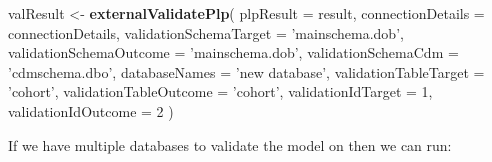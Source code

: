 \documentclass[11pt]{book}
\newenvironment{Shaded}{\begin{snugshade}}{\end{snugshade}}
\newcommand{\KeywordTok}[1]{\textcolor[rgb]{0.13,0.29,0.53}{\textbf{#1}}}
\newcommand{\DataTypeTok}[1]{\textcolor[rgb]{0.13,0.29,0.53}{#1}}
\newcommand{\DecValTok}[1]{\textcolor[rgb]{0.00,0.00,0.81}{#1}}
\newcommand{\StringTok}[1]{\textcolor[rgb]{0.31,0.60,0.02}{#1}}
\newcommand{\NormalTok}[1]{#1}
\theoremstyle{definition}
\theoremstyle{definition}
\theoremstyle{definition}
\theoremstyle{remark}
\begin{document}
\begin{Shaded}
\begin{Highlighting}[]
\NormalTok{valResult <-}\StringTok{ }\KeywordTok{externalValidatePlp}\NormalTok{(}
    \DataTypeTok{plpResult =}\NormalTok{ result, }
    \DataTypeTok{connectionDetails =}\NormalTok{ connectionDetails,}
    \DataTypeTok{validationSchemaTarget =} \StringTok{'mainschema.dob'}\NormalTok{,}
    \DataTypeTok{validationSchemaOutcome =} \StringTok{'mainschema.dob'}\NormalTok{,}
    \DataTypeTok{validationSchemaCdm =} \StringTok{'cdmschema.dbo'}\NormalTok{,}
    \DataTypeTok{databaseNames =} \StringTok{'new database'}\NormalTok{,}
    \DataTypeTok{validationTableTarget =} \StringTok{'cohort'}\NormalTok{,}
    \DataTypeTok{validationTableOutcome =} \StringTok{'cohort'}\NormalTok{,}
    \DataTypeTok{validationIdTarget =} \DecValTok{1}\NormalTok{,}
    \DataTypeTok{validationIdOutcome =} \DecValTok{2}
\NormalTok{)}
\end{Highlighting}
\end{Shaded}

If we have multiple databases to validate the model on then we can run:
\end{document}
